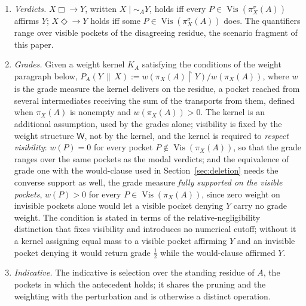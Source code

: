 \begin{definition}
\begin{enumerate}
\item[(f)] \emph{Verdicts.} $X \mathrel{\Box\!\!\rightarrow} Y$, written $X \mid\sim_A Y$, holds iff every $P \in \operatorname{Vis}(\pi^\sigma_X(A))$ affirms $Y$; $X \mathrel{\Diamond\!\!\rightarrow} Y$ holds iff some $P \in \operatorname{Vis}(\pi^\sigma_X(A))$ does. The quantifiers range over visible pockets of the disagreeing residue, the scenario fragment of this paper.
\item[(g)] \emph{Grades.} Given a weight kernel $K_A$ satisfying the conditions of the weight paragraph below, $P_A(Y \,\|\, X) := w(\pi_X(A) \restriction Y)/w(\pi_X(A))$, where $w$ is the grade measure the kernel delivers on the residue, a pocket reached from several intermediates receiving the sum of the transports from them, defined when $\pi_X(A)$ is nonempty and $w(\pi_X(A)) > 0$. The kernel is an additional assumption, used by the grades alone; visibility is fixed by the weight structure $\mathsf{W}$, not by the kernel, and the kernel is required to \emph{respect visibility}: $w(P) = 0$ for every pocket $P \notin \operatorname{Vis}(\pi_X(A))$, so that the grade ranges over the same pockets as the modal verdicts; and the equivalence of grade one with the would-clause used in Section~\ref{sec:deletion} needs the converse support as well, the grade measure \emph{fully supported on the visible pockets}, $w(P) > 0$ for every $P \in \operatorname{Vis}(\pi_X(A))$, since zero weight on invisible pockets alone would let a visible pocket denying $Y$ carry no grade weight. The condition is stated in terms of the relative-negligibility distinction that fixes visibility and introduces no numerical cutoff; without it a kernel assigning equal mass to a visible pocket affirming $Y$ and an invisible pocket denying it would return grade $\tfrac12$ while the would-clause affirmed $Y$.
\item[(h)] \emph{Indicative.} The indicative is selection over the standing residue of $A$, the pockets in which the antecedent holds; it shares the pruning and the weighting with the perturbation and is otherwise a distinct operation.
\end{enumerate}
\end{definition}

